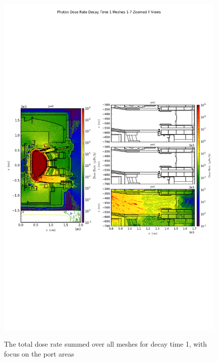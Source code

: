 \documentclass[12pt]{article}
\begin{document}
\begin{figure}[ht!]
\centering
\includegraphics[trim={0cm 9cm 0cm 10cm},clip,scale=0.75]{../plots/final_model/Photon_Dose_Rate_Decay_Time_1_Meshes_1-7_Zoomed_Y_Views.png}
\label{fig:photons_dc1_no4bc_total_zoomed}
\caption{The total dose rate summed over all meshes for decay time 1, with focus on the port areas}
\end{figure}
\end{document}
